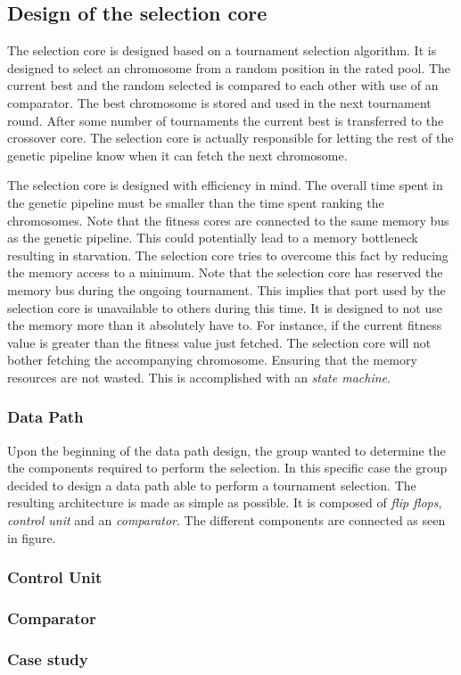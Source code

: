 \subsection {Design of the selection core} \label{fpga:selection:ss:selection_core}

The selection core is designed based on a tournament selection algorithm. It is designed to select an chromosome from a random position in the rated pool. The current best and the random selected is compared to each other with use of an comparator. The best chromosome is stored and used in the next tournament round. After some number of tournaments the current best is transferred to the crossover core. The selection core is actually responsible for letting the rest of the genetic pipeline know when it can fetch the next chromosome. 

The selection core is designed with efficiency in mind. The overall time spent in the genetic pipeline must be smaller than the time spent ranking the chromosomes. Note that the fitness cores are connected to the same memory bus as the genetic pipeline. This could potentially lead to a memory bottleneck resulting in starvation. The selection core tries to overcome this fact by reducing the memory access to a minimum. Note that the selection core has reserved the memory bus during the ongoing tournament. This implies that port used by the selection core is unavailable to others during this time. It is designed to not use the memory more than it absolutely have to. For instance, if the current fitness value is greater than the fitness value just fetched. The selection core will not bother fetching the accompanying chromosome. Ensuring that the memory resources are not wasted. This is accomplished with an \emph{state machine}. 



\subsubsection{Data Path}
Upon the beginning of the data path design, the group wanted to determine the the components required to perform the selection. In this specific case the group decided to design a data path able to perform a tournament selection. The resulting architecture is made as simple as possible.  It is composed of \emph{flip flops}, \emph{control unit} and an \emph{comparator}. The different components are connected as seen in figure.






\subsubsection{Control Unit} \label{fpga:selection:sss:control_unit}



\subsubsection {Comparator} \label{fpga:selection:sss:comparator}



\subsubsection{Case study} \label{fpga:selection:sss:case_study}



